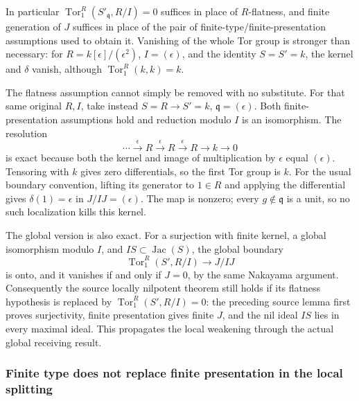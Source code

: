 In particular \(\operatorname{Tor}_1^R(S'_{\mathfrak q},R/I)=0\) suffices in place of \(R\)-flatness, and finite generation of \(J\) suffices in place of the pair of finite-type/finite-presentation assumptions used to obtain it. Vanishing of the whole Tor group is stronger than necessary: for \(R=k[\epsilon]/(\epsilon^2)\), \(I=(\epsilon)\), and the identity \(S=S'=k\), the kernel and \(\delta\) vanish, although \(\operatorname{Tor}_1^R(k,k)=k\).

The flatness assumption cannot simply be removed with no substitute. For that same original \(R,I\), take instead \(S=R\to S'=k\), \(\mathfrak q=(\epsilon)\). Both finite-presentation assumptions hold and reduction modulo \(I\) is an isomorphism. The resolution \[
\cdots\xrightarrow{\epsilon}R\xrightarrow{\epsilon}R
\xrightarrow{\epsilon}R\longrightarrow k\longrightarrow0
\] is exact because both the kernel and image of multiplication by \(\epsilon\) equal \((\epsilon)\). Tensoring with \(k\) gives zero differentials, so the first Tor group is \(k\). For the usual boundary convention, lifting its generator to \(1\in R\) and applying the differential gives \(\delta(1)=\epsilon\) in \(J/IJ=(\epsilon)\). The map is nonzero; every \(g\notin\mathfrak q\) is a unit, so no such localization kills this kernel.

The global version is also exact. For a surjection with finite kernel, a global isomorphism modulo \(I\), and \(IS\subset\operatorname{Jac}(S)\), the global boundary \[
\operatorname{Tor}_1^R(S',R/I)\longrightarrow J/IJ
\] is onto, and it vanishes if and only if \(J=0\), by the same Nakayama argument. Consequently the source locally nilpotent theorem still holds if its flatness hypothesis is replaced by \(\operatorname{Tor}_1^R(S',R/I)=0\): the preceding source lemma first proves surjectivity, finite presentation gives finite \(J\), and the nil ideal \(IS\) lies in every maximal ideal. This propagates the local weakening through the actual global receiving result.

\subsubsection{Finite type does not replace finite presentation in the local splitting}\label{finite-type-does-not-replace-finite-presentation-in-the-local-splitting}

